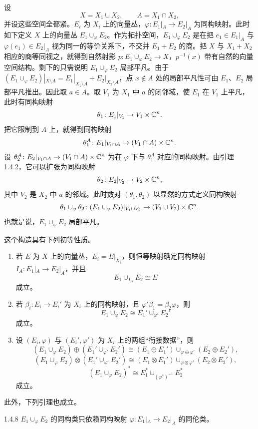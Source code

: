 设
\[
X=X_1\cup X_2,\qquad A=X_1\cap X_2,
\]
并设这些空间全都紧。$E_i$ 为 $X_i$ 上的向量丛，$\varphi\colon E_1|_A\to E_2|_A$ 为同构映射。此时如下定义 $X$ 上的向量丛 $E_1\cup_\varphi E_2$。作为拓扑空间，$E_1\cup_\varphi E_2$ 是在把 $e_1\in E_1|_A$ 与 $\varphi(e_1)\in E_2|_A$ 视为同一的等价关系下，不交并 $E_1+E_2$ 的商。把 $X$ 与 $X_1+X_2$ 相应的商等同视之，就得到自然射影 $p\colon E_1\cup_\varphi E_2\to X$，$p^{-1}(x)$ 带有自然的向量空间结构。剩下的只需说明 $E_1\cup_\varphi E_2$ 局部平凡。由于 $(E_1\cup_\varphi E_2)|_{X\setminus A}=E_1|_{X_1\setminus A}+E_2|_{X_2\setminus A}$，点 $x\notin A$ 处的局部平凡性可由 $E_1$、$E_2$ 局部平凡推出。因此取 $a\in A$。取 $V_1$ 为 $X_1$ 中 $a$ 的闭邻域，使 $E_1$ 在 $V_1$ 上平凡，此时有同构映射
\[
\theta_1\colon E_1|_{V_1}\to V_1\times\mathbb{C}^n.
\]
把它限制到 $A$ 上，就得到同构映射
\[
\theta_1^A\colon E_1|_{V_1\cap A}\to(V_1\cap A)\times\mathbb{C}^n.
\]
设 $\theta_2^A\colon E_2|_{V_1\cap A}\to(V_1\cap A)\times\mathbb{C}^n$ 为在 $\varphi$ 下与 $\theta_1^A$ 对应的同构映射。由引理 1.4.2，它可以扩张为同构映射
\[
\theta_2\colon E_2|_{V_2}\to V_2\times\mathbb{C}^n,
\]
其中 $V_2$ 是 $X_2$ 中 $a$ 的邻域。此时数对 $(\theta_1,\theta_2)$ 以显然的方式定义同构映射
\[
\theta_1\cup_\varphi\theta_2\colon(E_1\cup_\varphi E_2)|_{V_1\cup V_2}\to(V_1\cup V_2)\times\mathbb{C}^n.
\]
也就是说，$E_1\cup_\varphi E_2$ 局部平凡。

这个构造具有下列初等性质。

\begin{enumerate}[label=(\roman*),leftmargin=2.4em,itemsep=3pt]
\item 若 $E$ 为 $X$ 上的向量丛，$E_i=E|_{X_i}$，则恒等映射确定同构映射 $I_A\colon E_1|_A\to E_2|_A$，并且
\[
E_1\cup_{I_A}E_2\cong E
\]
成立。
\item 若 $\beta_i\colon E_i\to E_i'$ 为 $X_i$ 上的同构映射，且 $\varphi'\beta_1=\beta_2\varphi$，则
\[
E_1\cup_\varphi E_2\cong E_1'\cup_{\varphi'}E_2'
\]
成立。
\item 设 $(E_i,\varphi)$ 与 $(E_i',\varphi')$ 为 $X_i$ 上的两组“衔接数据”，则
\[
(E_1\cup_\varphi E_2)\oplus(E_1'\cup_{\varphi'}E_2')\cong(E_1\oplus E_1')\cup_{\varphi\oplus\varphi'}(E_2\oplus E_2'),
\]
\[
(E_1\cup_\varphi E_2)\otimes(E_1'\cup_{\varphi'}E_2')\cong(E_1\otimes E_1')\cup_{\varphi\otimes\varphi'}(E_2\otimes E_2'),
\]
\[
(E_1\cup_\varphi E_2)^*\cong E_1^*\cup_{(\varphi^*)^{-1}}E_2^*
\]
成立。
\end{enumerate}

此外，下列引理也成立。

\begin{lemma*}{1.4.8}
  $E_1\cup_\varphi E_2$ 的同构类只依赖同构映射 $\varphi\colon E_1|_A\to E_2|_A$ 的同伦类。
\end{lemma*}

